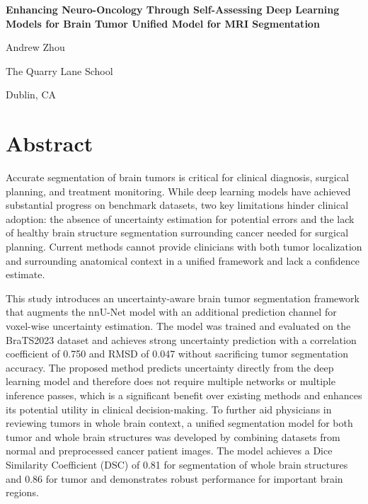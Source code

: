 \documentclass[11pt,letterpaper]{article}
\begin{document}
\begin{titlepage}
\centering
\vspace*{2in}
{\LARGE\bfseries Enhancing Neuro-Oncology Through Self-Assessing Deep Learning Models for Brain Tumor Unified Model for MRI Segmentation\par}
\vspace{2in}
{\large Andrew Zhou\par}
{\large The Quarry Lane School\par}
{\large Dublin, CA\par}
\vfill

\end{titlepage}
\thispagestyle{empty}
\section*{Abstract}
Accurate segmentation of brain tumors is critical for clinical diagnosis, surgical planning, and treatment monitoring. While deep learning models have achieved substantial progress on benchmark datasets, two key limitations hinder clinical adoption: the absence of uncertainty estimation for potential errors and the lack of healthy brain structure segmentation surrounding cancer needed for surgical planning. Current methods cannot provide clinicians with both tumor localization and surrounding anatomical context in a unified framework and lack a confidence estimate.

This study introduces an uncertainty-aware brain tumor segmentation framework that augments the nnU-Net model \cite{nnUnet} with an additional prediction channel for voxel-wise uncertainty estimation. The model was trained and evaluated on the BraTS2023 dataset \cite{BraTS2023} and achieves strong uncertainty prediction with a correlation coefficient of 0.750 and RMSD of 0.047 without sacrificing tumor segmentation accuracy. The proposed method predicts uncertainty directly from the deep learning model and therefore does not require multiple networks or multiple inference passes, which is a significant benefit over existing methods and enhances its potential utility in clinical decision-making. To further aid physicians in reviewing tumors in whole brain context, a unified segmentation model for both tumor and whole brain structures was developed by combining datasets from normal and preprocessed cancer patient images. The model achieves a Dice Similarity Coefficient (DSC) of 0.81 for segmentation of whole brain structures and 0.86 for tumor and demonstrates robust performance for important brain regions.
\end{document}
